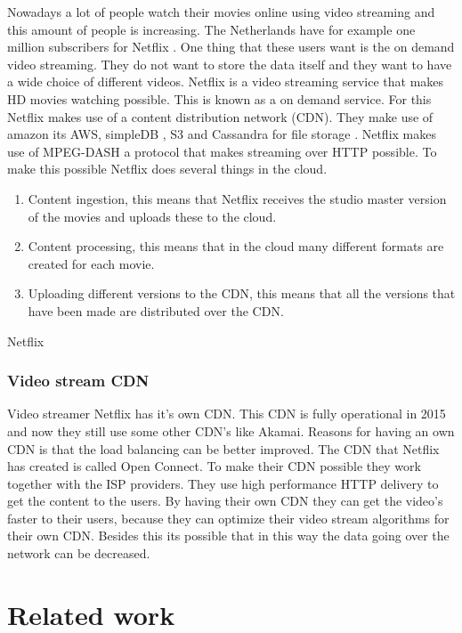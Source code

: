\documentclass{sig-alternate-br}
\begin{document}
Nowadays a lot of people watch their movies online using video streaming and this amount of people is increasing. The Netherlands have for example one million subscribers for Netflix \cite{volkskrant}. One thing that these users want is the on demand video streaming. They do not want to store the data itself and they want to have a wide choice of different videos. Netflix is a video streaming service that makes HD movies watching possible. This is known as a on demand service. For this Netflix makes use of a content distribution network (CDN). They make use of amazon its AWS, simpleDB , S3 and Cassandra for file storage \cite{Adhikari:2012}. Netflix makes use of MPEG-DASH a protocol that makes streaming over HTTP possible. To make this possible Netflix does several things in the cloud. 

 \begin{enumerate}[topsep=0pt,itemsep=-1ex,partopsep=1ex,parsep=1ex]
 	\item Content ingestion, this means that Netflix receives the studio master version of the movies and uploads these to the cloud. 
 	\item Content processing, this means that in the cloud many different formats are created for each movie.
 	\item Uploading different versions to the CDN,	this means that all the versions that have been made are distributed over the CDN.
 \end{enumerate}
Netflix ~\cite{Adhikari:2012}




\subsubsection{Video stream CDN}
Video streamer Netflix has  it's own CDN. This CDN is fully operational in 2015 and now they still use some other CDN's like Akamai. Reasons for having an own CDN is that the load balancing can be better improved. The CDN that Netflix has created is called Open Connect. To make their CDN possible they work together with the ISP providers. They use high performance HTTP delivery to get the content to the users. By having their own CDN they can get the video's faster to their users, because they can optimize their video stream algorithms for their own CDN. Besides this its possible that in this way the data going over the network can be decreased.


\section{Related work}
\end{document}
